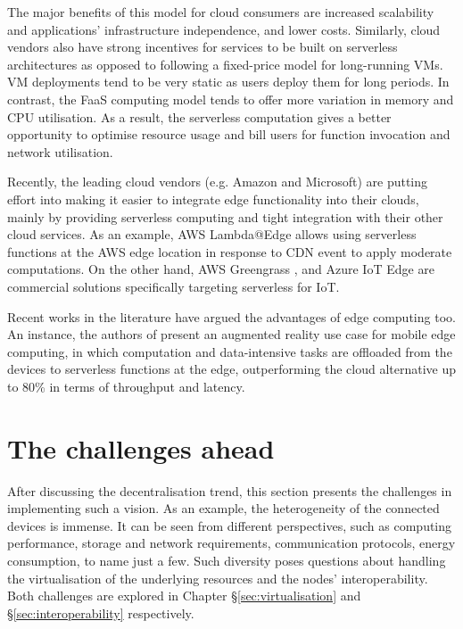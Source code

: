 The major benefits of this model for cloud consumers are increased scalability and applications' infrastructure independence, and lower costs. Similarly, cloud vendors also have strong incentives for services to be built on serverless architectures as opposed to following a fixed-price model for long-running VMs. VM deployments tend to be very static as users deploy them for long periods. In contrast, the FaaS computing model tends to offer more variation in memory and CPU utilisation. As a result, the serverless computation gives a better opportunity to optimise resource usage and bill users for function invocation and network utilisation.

Recently, the leading cloud vendors (e.g. Amazon and Microsoft) are putting effort into making it easier to integrate edge functionality into their clouds, mainly by providing serverless computing and tight integration with their other cloud services. As an example, AWS Lambda@Edge \cite{aws-lambda-edge} allows using serverless functions at the AWS edge location in response to CDN event to apply moderate computations. On the other hand, AWS Greengrass \cite{aws-greengrass}, and Azure IoT Edge \cite{azure-iot-edge} are commercial solutions specifically targeting serverless for IoT.

Recent works in the literature have argued the advantages of edge computing too. An instance, the authors of \cite{baresi2017empowering} present an augmented reality use case for mobile edge computing, in which computation and data-intensive tasks are offloaded from the devices to serverless functions at the edge, outperforming the cloud alternative up to 80\% in terms of throughput and latency.

\section{The challenges ahead}
\label{challenges}

After discussing the decentralisation trend, this section presents the challenges in implementing such a vision. As an example, the heterogeneity of the connected devices is immense. It can be seen from different perspectives, such as computing performance, storage and network requirements, communication protocols, energy consumption, to name just a few. Such diversity poses questions about handling the virtualisation of the underlying resources and the nodes' interoperability. Both challenges are explored in Chapter §\ref{sec:virtualisation} and §\ref{sec:interoperability} respectively.

